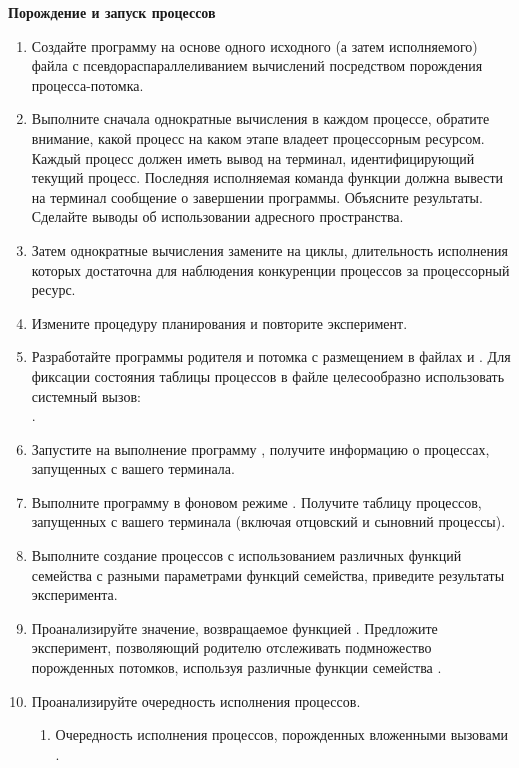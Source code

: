 \renewcommand{\labelenumii}{\theenumii}
\renewcommand{\theenumii}{\theenumi.\arabic{enumii}.}

\textbf{Порождение и запуск процессов}

\begin{enumerate}
	\item Создайте программу на основе одного исходного (а затем исполняемого) файла с псевдораспараллеливанием вычислений посредством порождения процесса-потомка.
	\item Выполните сначала однократные вычисления в каждом процессе, обратите внимание, какой процесс на каком этапе владеет процессорным ресурсом. Каждый процесс должен иметь вывод на терминал, идентифицирующий текущий процесс. Последняя исполняемая команда функции  должна вывести на терминал сообщение о завершении программы. Объясните результаты. Сделайте выводы об использовании адресного пространства.
	\item Затем однократные вычисления замените на циклы, длительность исполнения которых достаточна для наблюдения конкуренции процессов за процессорный ресурс.
	\item Измените процедуру планирования и повторите эксперимент.
	\item Разработайте программы родителя и потомка с размещением в файлах  и . Для фиксации состояния таблицы процессов в файле целесообразно использовать системный вызов:\\ .
	\item Запустите на выполнение программу , получите информацию о процессах, запущенных с вашего терминала.
	\item Выполните программу  в фоновом режиме . Получите таблицу процессов, запущенных с вашего терминала (включая отцовский и сыновний процессы).
	\item Выполните создание процессов с использованием различных функций семейства  с разными параметрами функций семейства, приведите результаты эксперимента.
	\item  Проанализируйте значение, возвращаемое функцией . Предложите эксперимент, позволяющий родителю отслеживать подмножество порожденных потомков, используя различные функции семейства .
	\item Проанализируйте очередность исполнения процессов.
		\begin{enumerate}
			\item Очередность исполнения процессов, порожденных вложенными вызовами .

\end{enumerate}
\end{enumerate}
